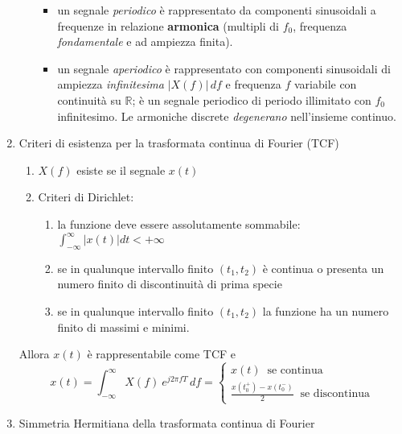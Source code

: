 \documentclass[
  paper=a4,
  ,captions=tableheading
]{scrartcl}
\providecommand{\tightlist}{%
  \setlength{\itemsep}{0pt}\setlength{\parskip}{0pt}}
\begin{document}
\begin{enumerate}
\begin{itemize}
    \begin{itemize}
    \tightlist
    \item
      un segnale \emph{periodico} è rappresentato da componenti
      sinusoidali a frequenze in relazione \textbf{armonica} (multipli
      di \(f_0\), frequenza \emph{fondamentale} e ad ampiezza finita).
    \item
      un segnale \emph{aperiodico} è rappresentato con componenti
      sinusoidali di ampiezza \emph{infinitesima} \(|X(f)|\,df\) e
      frequenza \(f\) variabile con continuità su \(\mathbb{R}\); è un
      segnale periodico di periodo illimitato con \(f_0\) infinitesimo.
      Le armoniche discrete \emph{degenerano} nell'insieme continuo.
    \end{itemize}
  \end{itemize}
\item
  Criteri di esistenza per la trasformata continua di Fourier (TCF)

  \begin{enumerate}
  \def\labelenumii{\arabic{enumii}.}
  \tightlist
  \item
    \(X(f)\) esiste se il segnale \(x(t)\)
  \item
    Criteri di Dirichlet:

    \begin{enumerate}
    \def\labelenumiii{\arabic{enumiii}.}
    \tightlist
    \item
      la funzione deve essere assolutamente sommabile:
      \(\displaystyle \int_{-\infty}^{\infty} |x(t)| dt < +\infty\)
    \item
      se in qualunque intervallo finito \((t_1, t_2)\) è continua o
      presenta un numero finito di discontinuità di prima specie
    \item
      se in qualunque intervallo finito \((t_1, t_2)\) la funzione ha un
      numero finito di massimi e minimi.
    \end{enumerate}
  \end{enumerate}

  Allora \(x(t)\) è rappresentabile come TCF e \[
  x(t) = \int_{-\infty}^{\infty}X(f)\ e^{j2\pi fT} \,df =  \left\{ \begin{array}{cl}
  x(t) \ \text{ se continua}  \\
  \frac{x(t_{0}^{+})-x(t_{0}^{-})}{2}\ \text{ se discontinua}
  \end{array} \right.
  \] \newpage
\item
  Simmetria Hermitiana della trasformata continua di Fourier


\end{enumerate}
\end{document}
